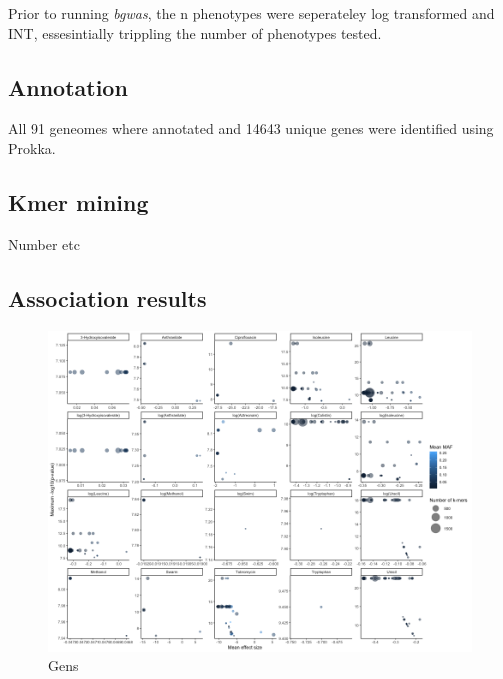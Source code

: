 \documentclass[]{DissertateUSU}
\begin{document}
Prior to running \emph{bgwas}, the n phenotypes were seperateley log
transformed and INT, essesintially trippling the number of phenotypes
tested.

\hypertarget{annotation}{%
\subsection{Annotation}\label{annotation}}

All 91 geneomes where annotated and 14643 unique genes were identified
using Prokka.

\hypertarget{kmer-mining}{%
\subsection{Kmer mining}\label{kmer-mining}}

Number etc

\hypertarget{association-results}{%
\subsection{Association results}\label{association-results}}

\begin{figure}

{\centering \includegraphics[height=0.9\textheight]{_static/genes} 

}

\caption{\label{fig:genes}Gens}\label{fig:unnamed-chunk-8}
\end{figure}
\end{document}
